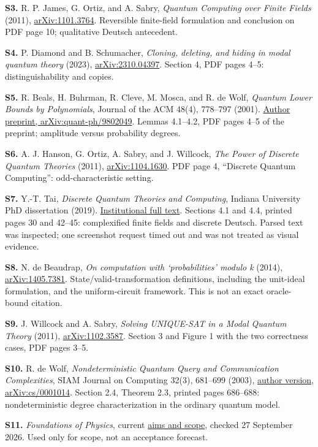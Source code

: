 \documentclass[
  11pt,
]{article}
\begin{document}
\textbf{S3.} R. P. James, G. Ortiz, and A. Sabry, \emph{Quantum
Computing over Finite Fields} (2011),
\href{https://arxiv.org/abs/1101.3764}{arXiv:1101.3764}. Reversible
finite-field formulation and conclusion on PDF page 10; qualitative
Deutsch antecedent.

\textbf{S4.} P. Diamond and B. Schumacher, \emph{Cloning, deleting, and
hiding in modal quantum theory} (2023),
\href{https://arxiv.org/abs/2310.04397}{arXiv:2310.04397}. Section 4,
PDF pages 4--5: distinguishability and copies.

\textbf{S5.} R. Beals, H. Buhrman, R. Cleve, M. Mosca, and R. de Wolf,
\emph{Quantum Lower Bounds by Polynomials}, Journal of the ACM 48(4),
778--797 (2001). \href{https://arxiv.org/abs/quant-ph/9802049}{Author
preprint, arXiv:quant-ph/9802049}. Lemmas 4.1--4.2, PDF pages 4--5 of
the preprint; amplitude versus probability degrees.

\textbf{S6.} A. J. Hanson, G. Ortiz, A. Sabry, and J. Willcock,
\emph{The Power of Discrete Quantum Theories} (2011),
\href{https://arxiv.org/abs/1104.1630}{arXiv:1104.1630}. PDF page 4,
``Discrete Quantum Computing'': odd-characteristic setting.

\textbf{S7.} Y.-T. Tai, \emph{Discrete Quantum Theories and Computing},
Indiana University PhD dissertation (2019).
\href{https://scholarworks.iu.edu/iuswrrest/api/core/bitstreams/1b636595-9156-4c14-8fe1-da1c1cf74e99/content}{Institutional
full text}. Sections 4.1 and 4.4, printed pages 30 and 42--45:
complexified finite fields and discrete Deutsch. Parsed text was
inspected; one screenshot request timed out and was not treated as
visual evidence.

\textbf{S8.} N. de Beaudrap, \emph{On computation with `probabilities'
modulo k} (2014),
\href{https://arxiv.org/abs/1405.7381}{arXiv:1405.7381}.
State/valid-transformation definitions, including the unit-ideal
formulation, and the uniform-circuit framework. This is not an exact
oracle-bound citation.

\textbf{S9.} J. Willcock and A. Sabry, \emph{Solving UNIQUE-SAT in a
Modal Quantum Theory} (2011),
\href{https://arxiv.org/abs/1102.3587}{arXiv:1102.3587}. Section 3 and
Figure 1 with the two correctness cases, PDF pages 3--5.

\textbf{S10.} R. de Wolf, \emph{Nondeterministic Quantum Query and
Communication Complexities}, SIAM Journal on Computing 32(3), 681--699
(2003), \href{https://arxiv.org/abs/cs/0001014}{author version,
arXiv:cs/0001014}. Section 2.4, Theorem 2.3, printed pages 686--688:
nondeterministic degree characterization in the ordinary quantum model.

\textbf{S11.} \emph{Foundations of Physics}, current
\href{https://link.springer.com/journal/10701/aims-and-scope}{aims and
scope}, checked 27 September 2026. Used only for scope, not an
acceptance forecast.
\end{document}
